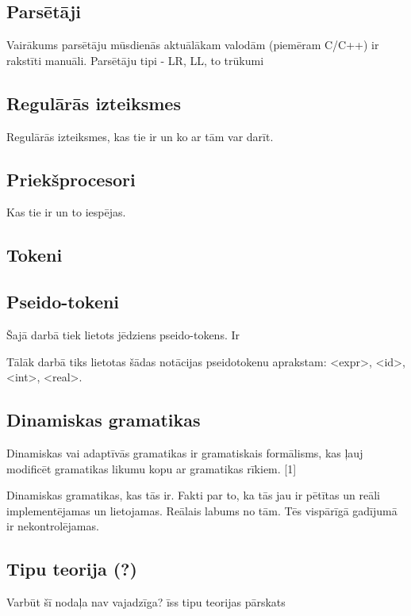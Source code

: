 \subsection{Parsētāji}
Vairākums parsētāju mūsdienās aktuālākam valodām (piemēram C/C++) ir rakstīti manuāli. 
Parsētāju tipi - LR, LL, to trūkumi

\subsection{Regulārās izteiksmes}
Regulārās izteiksmes, kas tie ir un ko ar tām var darīt.

\subsection{Priekšprocesori}
Kas tie ir un to iespējas.

\subsection{Tokeni}

\subsection{Pseido-tokeni}
Šajā darbā tiek lietots jēdziens pseido-tokens. Ir 

Tālāk darbā tiks lietotas šādas notācijas pseidotokenu aprakstam: <expr>, <id>, <int>, <real>.

\subsection{\label{subsec:dynamicgrammars}Dinamiskas gramatikas}
Dinamiskas vai adaptīvās gramatikas ir gramatiskais formālisms, kas ļauj modificēt gramatikas likumu kopu ar gramatikas rīkiem. [1]

Dinamiskas gramatikas, kas tās ir. Fakti par to, ka tās jau ir pētītas un reāli implementējamas un lietojamas. Reālais labums no tām.
 Tēs vispārīgā gadījumā ir nekontrolējamas.


\subsection{Tipu teorija (?)}
Varbūt šī nodaļa nav vajadzīga?
īss tipu teorijas pārskats